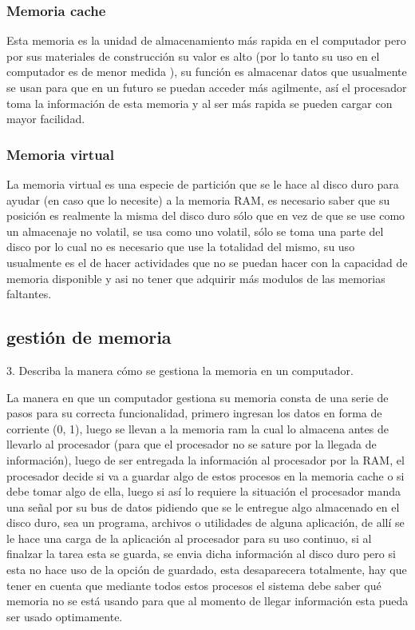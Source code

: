 \documentclass{article}
\begin{document}
\subsubsection{Memoria cache}
Esta memoria es la unidad de almacenamiento más rapida en el computador pero por sus materiales de construcción su valor es alto (por lo tanto su uso en el computador es de menor medida ), su función es almacenar datos que usualmente se usan para que en un futuro se puedan acceder más agilmente, así el procesador toma la información de esta memoria y al ser más rapida se pueden cargar con mayor facilidad.
\vfill
\vspace{0,0cm}
\subsubsection{Memoria virtual}
La memoria virtual es una especie de partición que se le hace al disco duro para ayudar (en caso que lo necesite) a la memoria RAM, es necesario saber que su posición es realmente la misma del disco duro sólo que en vez de que se use como un almacenaje no volatil, se usa como uno volatil, sólo se toma una parte del disco por lo cual no es necesario que use la totalidad del mismo, su uso usualmente es el de hacer actividades que no se puedan hacer con la capacidad de memoria disponible y asi no tener que adquirir más modulos de las memorias faltantes.

\subsection{gestión de memoria}
3. Describa la manera cómo se gestiona la memoria en un computador.\cite{refer}\vspace{0.5cm}


La manera en que un computador gestiona su memoria consta de una serie de pasos para su correcta funcionalidad, primero ingresan los datos en forma de corriente (0, 1), luego se llevan a la memoria ram la cual lo almacena antes de llevarlo al procesador (para que el procesador no se sature por la llegada de información), luego de ser entregada la información al procesador por la RAM, el procesador decide si va a guardar algo de estos procesos en la memoria cache o si debe tomar algo de ella, luego si así lo requiere la situación el procesador manda una señal por su bus de datos pidiendo que se le entregue algo almacenado en el disco duro, sea un programa, archivos o utilidades de alguna aplicación, de allí se le hace una carga de la aplicación al procesador para su uso continuo, si al finalzar la tarea esta se guarda, se envia dicha información al disco duro pero si esta no hace uso de la opción de guardado, esta desaparecera totalmente, hay que tener en cuenta que mediante todos estos procesos el sistema debe saber qué memoria no se está usando para que al momento de llegar información esta pueda ser usado optimamente.
\end{document}
